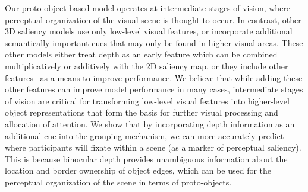 Our proto-object based model operates at intermediate stages of vision, where perceptual organization of the visual scene is thought to occur. In contrast, other 3D saliency models use only low-level visual features, or incorporate additional semantically important cues that may only be found in higher visual areas. These other models either treat depth as an early feature which can be combined multiplicatively or additively with the 2D saliency map, or they include other features~\citep[such as human face and body detection,][]{Cerf_etal08} as a means to improve performance. We believe that while adding these other features can improve model performance in many cases, intermediate stages of vision are critical for transforming low-level visual features into higher-level object representations that form the basis for further visual processing and allocation of attention. We show that by incorporating depth information as an additional cue into the grouping mechanism, we can more accurately predict where participants will fixate within a scene (\ie as a marker of perceptual saliency). This is because binocular depth provides unambiguous information about the location and border ownership of object edges, which can be used for the perceptual organization of the scene in terms of proto-objects.
 
